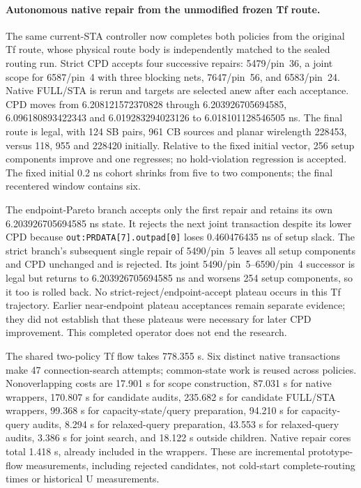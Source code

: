 \paragraph{Autonomous native repair from the unmodified frozen Tf route.}
The same current-STA controller now completes both policies from the original Tf route, whose physical route body is independently matched to the sealed routing run. Strict CPD accepts four successive repairs: 5479/pin~36, a joint scope for 6587/pin~4 with three blocking nets, 7647/pin~56, and 6583/pin~24. Native FULL/STA is rerun and targets are selected anew after each acceptance. CPD moves from 6.208121572370828 through 6.203926705694585, 6.096180893422343 and 6.019283294023126 to 6.018101128546505 ns. The final route is legal, with 124 SB pairs, 961 CB sources and planar wirelength 228453, versus 118, 955 and 228420 initially. Relative to the fixed initial vector, 256 setup components improve and one regresses; no hold-violation regression is accepted. The fixed initial 0.2 ns cohort shrinks from five to two components; the final recentered window contains six.

The endpoint-Pareto branch accepts only the first repair and retains its own 6.203926705694585 ns state. It rejects the next joint transaction despite its lower CPD because \texttt{out:PRDATA[7].outpad[0]} loses 0.460476435 ns of setup slack. The strict branch's subsequent single repair of 5490/pin~5 leaves all setup components and CPD unchanged and is rejected. Its joint 5490/pin~5--6590/pin~4 successor is legal but returns to 6.203926705694585 ns and worsens 254 setup components, so it too is rolled back. No strict-reject/endpoint-accept plateau occurs in this Tf trajectory. Earlier near-endpoint plateau acceptances remain separate evidence; they did not establish that these plateaus were necessary for later CPD improvement. This completed operator does not end the research.

The shared two-policy Tf flow takes 778.355 s. Six distinct native transactions make 47 connection-search attempts; common-state work is reused across policies. Nonoverlapping costs are 17.901 s for scope construction, 87.031 s for native wrappers, 170.807 s for candidate audits, 235.682 s for candidate FULL/STA wrappers, 99.368 s for capacity-state/query preparation, 94.210 s for capacity-query audits, 8.294 s for relaxed-query preparation, 43.553 s for relaxed-query audits, 3.386 s for joint search, and 18.122 s outside children. Native repair cores total 1.418 s, already included in the wrappers. These are incremental prototype-flow measurements, including rejected candidates, not cold-start complete-routing times or historical U measurements.

